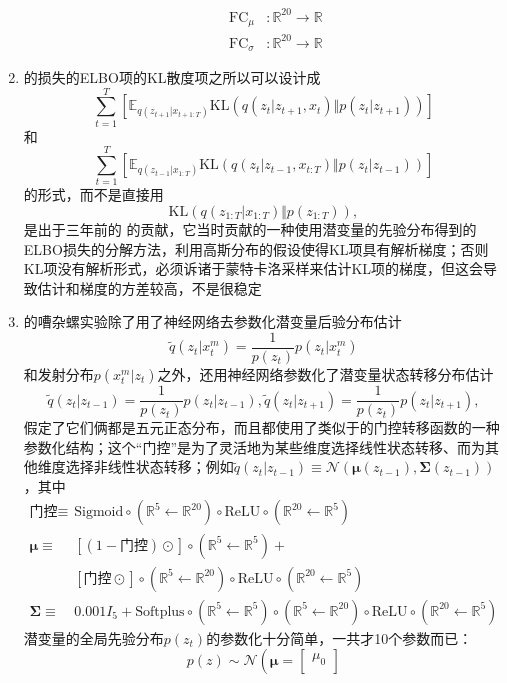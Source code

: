 \documentclass[11pt]{article}
\begin{document}
\begin{enumerate}
\begin{enumerate}
\[\begin{split}
\text{FC}_\mu&: \mathbb{R}^{20}\to\mathbb{R}\\
\text{FC}_\sigma&: \mathbb{R}^{20}\to\mathbb{R}
\end{split}
\] 
\end{enumerate}
\item \cite{Tan2019FactorizedII}的损失的ELBO项的KL散度项之所以可以设计成\[
\sum_{t=1}^T[\mathbb{E}_{q(z_{t+1}|x_{t+1:T})}\text{KL}\left(q(z_t|z_{t+1},x_t)\Vert p(z_t|z_{t+1})\right)]
\]和\[
\sum_{t=1}^T[\mathbb{E}_{q(z_{t-1}|x_{1:T})}\text{KL}(q(z_t|z_{t-1},x_{t:T})\Vert p(z_t|z_{t-1}))]
\]的形式，而不是直接用\[
\text{KL}\left(q(z_{1:T}|x_{1:T})\Vert p(z_{1:T})\right),
\]是出于三年前的 \cite{krishnan2017structured} 的贡献，它当时贡献的一种使用潜变量的先验分布得到的ELBO损失的分解方法，利用高斯分布的假设使得KL项具有解析梯度；否则KL项没有解析形式，必须诉诸于蒙特卡洛采样来估计KL项的梯度，但这会导致估计和梯度的方差较高，不是很稳定
\item \cite{Tan2019FactorizedII} 的嘈杂螺实验除了用了神经网络去参数化潜变量后验分布估计\[
\tilde{q}(z_t|x_t^m) = \frac{1}{p(z_t)}p(z_t|x_t^m)
\]和发射分布$p(x_t^m|z_t)$之外，还用神经网络参数化了潜变量状态转移分布估计\[
\tilde{q}(z_t|z_{t-1}) = \frac{1}{p(z_t)}p(z_t|z_{t-1}),\tilde{q}(z_t|z_{t+1}) = \frac{1}{p(z_t)}p(z_t|z_{t+1}),
\]假定了它们俩都是五元正态分布，而且都使用了类似于\cite{krishnan2017structured}的门控转移函数的一种参数化结构；这个``门控''是为了灵活地为某些维度选择线性状态转移、而为其他维度选择非线性状态转移；例如$\tilde{q}(z_t|z_{t-1})\equiv\mathcal{N}(\boldsymbol{\mu}(z_{t-1}),\boldsymbol{\Sigma}(z_{t-1}))$，其中\[
\begin{split}
\text{门控}\equiv&\text{Sigmoid}\circ(\mathbb{R}^{5}\leftarrow\mathbb{R}^{20})\circ\text{ReLU}\circ(\mathbb{R}^{20}\leftarrow\mathbb{R}^5)\\
\boldsymbol{\mu}\equiv&[(1-\text{门控})\odot]\circ(\mathbb{R}^{5}\leftarrow\mathbb{R}^{5})+\\
&[\text{门控}\odot]\circ(\mathbb{R}^{5}\leftarrow\mathbb{R}^{20})\circ\text{ReLU}\circ(\mathbb{R}^{20}\leftarrow\mathbb{R}^{5})\\
\boldsymbol{\Sigma}\equiv&0.001I_5+\text{Softplus}\circ(\mathbb{R}^{5}\leftarrow\mathbb{R}^5)\circ(\mathbb{R}^{5}\leftarrow\mathbb{R}^{20})\circ\text{ReLU}\circ(\mathbb{R}^{20}\leftarrow\mathbb{R}^{5})
\end{split}
\]潜变量的全局先验分布$p(z_t)$的参数化十分简单，一共才10个参数而已：\[
p(z)\sim\mathcal{N}
\left(\boldsymbol{\mu}=\begin{bmatrix}
\mu_0\\

\end{bmatrix}\]
\end{enumerate}
\end{document}

